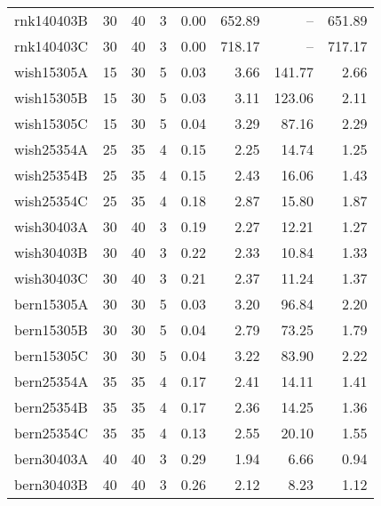 \begin{scriptsize}
\begin{xtabular*}{\linewidth}{@{\extracolsep{\fill}}lrrrrrrr@{}}
rnk140403B & \num{30} & \num{40} & \num{3} & \num{0.00} & \num{652.89} & -- & \num{651.89} \\ 
rnk140403C & \num{30} & \num{40} & \num{3} & \num{0.00} & \num{718.17} & -- & \num{717.17} \\ 
wish15305A & \num{15} & \num{30} & \num{5} & \num{0.03} & \num{3.66} & \num{141.77} & \num{2.66} \\ 
wish15305B & \num{15} & \num{30} & \num{5} & \num{0.03} & \num{3.11} & \num{123.06} & \num{2.11} \\ 
wish15305C & \num{15} & \num{30} & \num{5} & \num{0.04} & \num{3.29} & \num{87.16} & \num{2.29} \\ 
wish25354A & \num{25} & \num{35} & \num{4} & \num{0.15} & \num{2.25} & \num{14.74} & \num{1.25} \\ 
wish25354B & \num{25} & \num{35} & \num{4} & \num{0.15} & \num{2.43} & \num{16.06} & \num{1.43} \\ 
wish25354C & \num{25} & \num{35} & \num{4} & \num{0.18} & \num{2.87} & \num{15.80} & \num{1.87} \\ 
wish30403A & \num{30} & \num{40} & \num{3} & \num{0.19} & \num{2.27} & \num{12.21} & \num{1.27} \\ 
wish30403B & \num{30} & \num{40} & \num{3} & \num{0.22} & \num{2.33} & \num{10.84} & \num{1.33} \\ 
wish30403C & \num{30} & \num{40} & \num{3} & \num{0.21} & \num{2.37} & \num{11.24} & \num{1.37} \\ 
bern15305A & \num{30} & \num{30} & \num{5} & \num{0.03} & \num{3.20} & \num{96.84} & \num{2.20} \\ 
bern15305B & \num{30} & \num{30} & \num{5} & \num{0.04} & \num{2.79} & \num{73.25} & \num{1.79} \\ 
bern15305C & \num{30} & \num{30} & \num{5} & \num{0.04} & \num{3.22} & \num{83.90} & \num{2.22} \\ 
bern25354A & \num{35} & \num{35} & \num{4} & \num{0.17} & \num{2.41} & \num{14.11} & \num{1.41} \\ 
bern25354B & \num{35} & \num{35} & \num{4} & \num{0.17} & \num{2.36} & \num{14.25} & \num{1.36} \\ 
bern25354C & \num{35} & \num{35} & \num{4} & \num{0.13} & \num{2.55} & \num{20.10} & \num{1.55} \\ 
bern30403A & \num{40} & \num{40} & \num{3} & \num{0.29} & \num{1.94} & \num{6.66} & \num{0.94} \\ 
bern30403B & \num{40} & \num{40} & \num{3} & \num{0.26} & \num{2.12} & \num{8.23} & \num{1.12} \\ 

\end{xtabular*}
\end{scriptsize}
